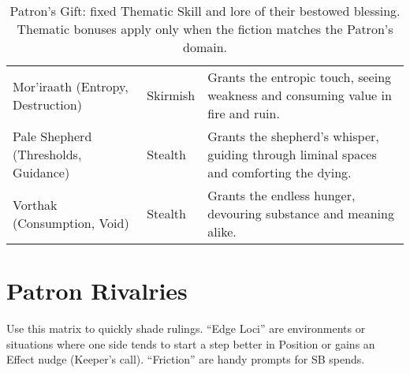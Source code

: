 \begin{table}[H]
\begin{tabular}{@{}p{3.8cm}p{3.8cm}p{7.5cm}@{}}
  Mor'iraath (Entropy, Destruction) & Skirmish & Grants the entropic touch, seeing weakness and consuming value in fire and ruin. \\
  Pale Shepherd (Thresholds, Guidance) & Stealth & Grants the shepherd's whisper, guiding through liminal spaces and comforting the dying. \\
  Vorthak (Consumption, Void) & Stealth & Grants the endless hunger, devouring substance and meaning alike. \\
  \bottomrule
  \end{tabular}
  \caption{Patron's Gift: fixed Thematic Skill and lore of their bestowed blessing. Thematic bonuses apply only when the fiction matches the Patron's domain.}
  \label{tab:gift-thematic-map}
  \end{table}

  


\section*{Patron Rivalries}
\label{app:patron-rivalries}

Use this matrix to quickly shade rulings. “Edge Loci” are environments or situations where one side tends to start a step better in Position or gains an Effect nudge (Keeper’s call). “Friction” are handy prompts for SB spends.

\renewcommand{\arraystretch}{1.15}
\setlength{\LTpre}{0pt}
\setlength{\LTpost}{0pt}

